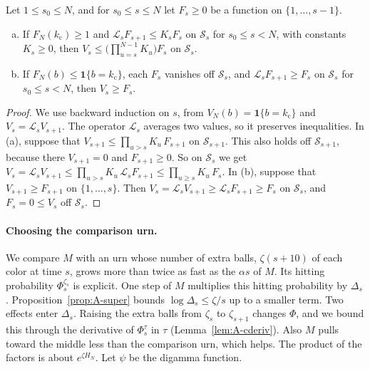 \begin{lemma}\label{lem:A-compare}
Let $1\le s_0\le N$, and for $s_0\le s\le N$ let $F_s\ge0$ be a function on
$\{1,\dots,s-1\}$.
\begin{enumerate}[(a)]
\item If $F_N({k_{\mathrm c}})\ge1$ and $\mathcal L_sF_{s+1}\le K_sF_s$ on $\mathcal S_s$
for $s_0\le s<N$, with constants $K_s\ge0$, then
$V_s\le\bigl(\prod_{u=s}^{N-1}K_u\bigr)F_s$ on $\mathcal S_s$.
\item If $F_N(b)\le\mathbf 1\{b={k_{\mathrm c}}\}$, each $F_s$ vanishes off $\mathcal S_s$,
and $\mathcal L_sF_{s+1}\ge F_s$ on $\mathcal S_s$ for $s_0\le s<N$, then
$V_s\ge F_s$.
\end{enumerate}
\end{lemma}

\begin{proof}
We use backward induction on $s$, from $V_N(b)=\mathbf 1\{b={k_{\mathrm c}}\}$ and
$V_s=\mathcal L_sV_{s+1}$. The operator $\mathcal L_s$ averages two values, so it preserves inequalities. In (a), suppose that
$V_{s+1}\le\prod_{u>s}K_u\,F_{s+1}$ on $\mathcal S_{s+1}$. This also holds
off $\mathcal S_{s+1}$, because there $V_{s+1}=0$ and $F_{s+1}\ge0$. So on
$\mathcal S_s$ we get
$V_s=\mathcal L_sV_{s+1}\le\prod_{u>s}K_u\,\mathcal L_sF_{s+1}
\le\prod_{u\ge s}K_u\,F_s$. In (b), suppose that $V_{s+1}\ge F_{s+1}$ on
$\{1,\dots,s\}$. Then
$V_s=\mathcal L_sV_{s+1}\ge\mathcal L_sF_{s+1}\ge F_s$ on $\mathcal S_s$, and
$F_s=0\le V_s$ off $\mathcal S_s$.
\end{proof}

\paragraph{Choosing the comparison urn.}
We compare $M$ with an urn whose number of extra balls, $\zeta(s+10)$ of
each color at time $s$, grows more than twice as fast as the $\alpha s$ of $M$.
Its hitting probability $\Phi^{\zeta_s}_s$ is explicit. One step of $M$ multiplies this hitting probability by $\Delta_s$. Proposition~\ref{prop:A-super} bounds $\log\Delta_s\le\zeta/s$ up to a smaller term. Two effects enter $\Delta_s$. Raising the extra balls from
$\zeta_s$ to $\zeta_{s+1}$ changes $\Phi$, and we bound this through the
derivative of $\Phi^\tau_s$ in $\tau$ (Lemma~\ref{lem:A-cderiv}). Also $M$
pulls toward the middle less than the comparison urn, which helps. The
product of the factors is about $e^{\zeta H_N}$. Let $\psi$ be the digamma
function.

